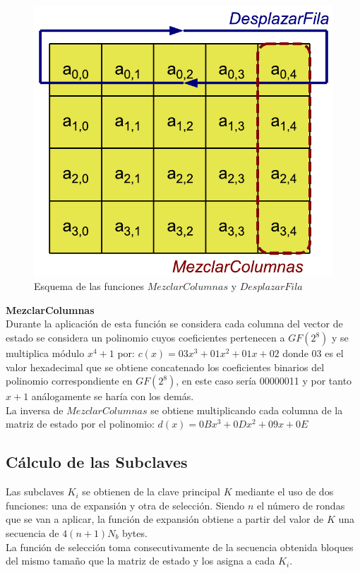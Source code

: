 \begin{description}
		\begin{figure}[htb]
			\centering
			\includegraphics[scale=0.4]{imagenes/aesdesplazarmezclar.png} 
			\caption{Esquema de las funciones $MezclarColumnas$ y $DesplazarFila$ \cite{En2011}}
			\label{desplazarymezclar}
		\end{figure}
\newpage
	\item \textbf{MezclarColumnas}\\
		Durante la aplicación de esta función se considera cada columna del vector de estado se considera un polinomio cuyos coeficientes pertenecen a $GF(2^8)$ y se multiplica módulo $x^4+1$ por: $c(x)=03x^3+01x^2+01x+02$ donde 03 es el valor hexadecimal que se obtiene concatenado los coeficientes binarios del polinomio correspondiente en $GF(2^8)$, en este caso sería 00000011 y por tanto $x+1$ análogamente se haría con los demás.\\
		La inversa de $MezclarColumnas$ se obtiene multiplicando cada columna de la matriz de estado por el polinomio: $d(x)=0Bx^3+0Dx^2+09x+0E$

\end{description}

\subsection{Cálculo de las Subclaves}
Las subclaves $K_i$ se obtienen de la clave principal $K$ mediante el uso de dos funciones: una de expansión y otra de selección. Siendo $n$ el número de rondas que se van a aplicar, la función de expansión obtiene a partir del valor de $K$ una secuencia de $4(n+1)N_b$ bytes.\\
La función de selección toma consecutivamente de la secuencia obtenida bloques del mismo tamaño que la matriz de estado y los asigna a cada $K_i$.\\


